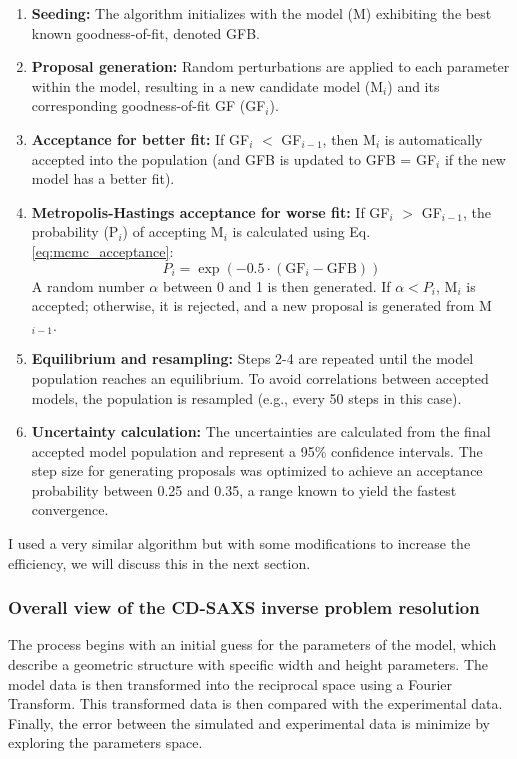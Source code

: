 \begin{enumerate}
    \item \textbf{Seeding:} The algorithm initializes with the model (M) exhibiting the best known goodness-of-fit, denoted GFB.
    \item \textbf{Proposal generation:} Random perturbations are applied to each parameter within the model, resulting in a new candidate model (M$_i$) and its corresponding goodness-of-fit GF (GF$_i$).
    \item \textbf{Acceptance for better fit:} If GF$_i$ $<$ GF$_{i-1}$, then M$_i$ is automatically accepted into the population (and GFB is updated to GFB = GF$_i$ if the new model has a better fit).
    \item \textbf{Metropolis-Hastings acceptance for worse fit:} If GF$_i$ $>$ GF$_{i-1}$, the probability (P$_i$) of accepting M$_i$ is calculated using Eq. \eqref{eq:mcmc_acceptance}:
    \begin{equation}
        P_i = \exp \left( -0.5 \cdot (\text{GF}_i - \text{GFB}) \right) \label{eq:mcmc_acceptance}
    \end{equation}
    A random number $\alpha$ between 0 and 1 is then generated. If $\alpha < P_i$, M$_i$ is accepted; otherwise, it is rejected, and a new proposal is generated from M$_{i-1}$.
    \item \textbf{Equilibrium and resampling:} Steps 2-4 are repeated until the model population reaches an equilibrium. To avoid correlations between accepted models, the population is resampled (e.g., every 50 steps in this case).
    \item \textbf{Uncertainty calculation:} The uncertainties are calculated from the final accepted model population and represent a 95\% confidence intervals. The step size for generating proposals was optimized to achieve an
    acceptance probability between 0.25 and 0.35, a range known to yield the fastest convergence.
\end{enumerate}

I used a very similar algorithm but with some modifications to increase the efficiency, we will discuss this in the next section.

\subsubsection{Overall view of the CD-SAXS inverse problem resolution}

\medskip

The process begins with an initial guess for the parameters of the model, which describe a geometric structure with specific width and height parameters. The model data is then transformed into the reciprocal space using a Fourier Transform.
This transformed data is then compared with the experimental data. Finally, the error between the simulated and experimental data is minimize by exploring the parameters space.

